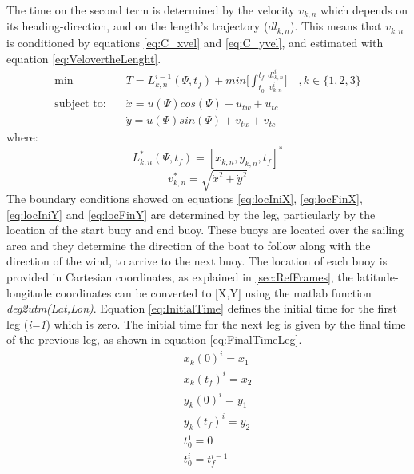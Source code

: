 The time on the second term is determined by the velocity $v_{k,n}$ which depends on its heading-direction, and on the length's trajectory ($dl_{k,n}$). This means that $v_{k,n}$ is  conditioned by equations \ref{eq:C_xvel} and \ref{eq:C_yvel}, and estimated with equation \ref{eq:VelovertheLenght}.
\begin{align}
    \text{min } & T=
    L_{k,n}^{i-1}(\Psi,t_{f})+ min \bigg[ \int_{t_{0}}^{t_{f}}  \frac{dl_{k,n}^i}{v_{k,n}^i} \bigg] \quad ,k \in \{1,2,3\} \label{eq:minTO}\\
\text{subject to:} \quad & \Dot{x}=u(\Psi)cos(\Psi) + u_{tw}+u_{tc} \label{eq:C_xvel} \\
\quad & \Dot{y}=u(\Psi)sin(\Psi) + v_{tw}+v_{tc} \label{eq:C_yvel}
\end{align}
where:
\begin{equation}\label{eq:CollectPointsTime}
     L_{k,n}^{*}(\Psi,t_{f})=[x_{k,n}, y_{k,n},t_{f}]^{*}
\end{equation}
\begin{equation}\label{eq:VelovertheLenght}
     v_{k,n}^{*}=\sqrt{\Dot{x}^2+\Dot{y}^2}
\end{equation}
The boundary conditions showed on equations \ref{eq:locIniX}, \ref{eq:locFinX}, \ref{eq:locIniY} and \ref{eq:locFinY} are determined by the leg, particularly by the location of the start buoy and end buoy. These buoys are located over the sailing area and they determine the direction of the boat to follow along with the direction of the wind, to arrive to the next buoy. The location of each buoy is provided in Cartesian coordinates, as explained in \ref{sec:RefFrames}, the latitude-longitude coordinates can be converted to [X,Y] using the \acrshort{matlab} function \textit{deg2utm(Lat,Lon)}. Equation \ref{eq:InitialTime} defines the initial time for the first leg (\textit{i=1}) which is zero. The initial time for the next leg is given by the final time of the previous leg, as shown in equation \ref{eq:FinalTimeLeg}.
\begin{align}
    \quad & x_{k}(0)^i=x_{1}\label{eq:locIniX} \\
    \quad & x_{k}(t_{f})^i=x_{2}\label{eq:locFinX} \\
    \quad & y_{k}(0)^i=y_{1}\label{eq:locIniY} \\
    \quad & y_{k}(t_{f})^i=y_{2}\label{eq:locFinY}\\
    \quad & t_{0}^1=0 \label{eq:InitialTime} \\
    \quad & t_{0}^{i}= t_{f}^{i-1} \label{eq:FinalTimeLeg}
\end{align}
